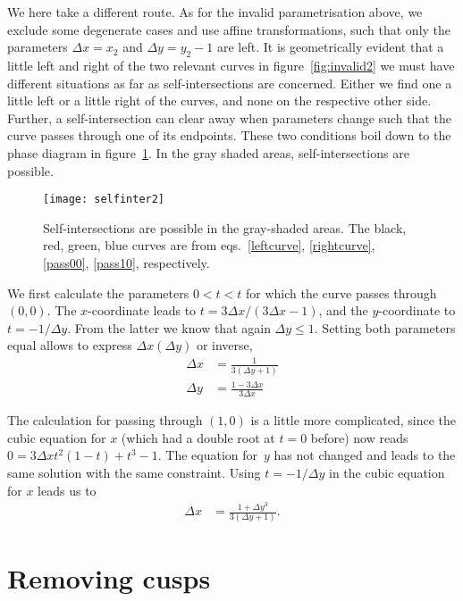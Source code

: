 \documentclass{article}
\begin{document}
We here take a different route. As for the invalid parametrisation above, we
exclude some degenerate cases and use affine transformations, such that only the
parameters $\Delta x=x_2$ and $\Delta y=y_2-1$ are left. It is geometrically
evident that a little left and right of the two relevant curves in
figure~\ref{fig:invalid2} we must have different situations as far as
self-intersections are concerned. Either we find one a little left or a little
right of the curves, and none on the respective other side. Further, a
self-intersection can clear away when parameters change such that the curve
passes through one of its endpoints. These two conditions boil down to the phase
diagram in figure~\ref{fig:selfinter2}. In the gray shaded areas,
self-intersections are possible.
%
\begin{figure}[t]
  \texttt{[image: selfinter2]}%
  \caption{Self-intersections are possible in the gray-shaded areas. The black,
  red, green, blue curves are from eqs.~\eqref{leftcurve}, \eqref{rightcurve},
  \eqref{pass00}, \eqref{pass10}, respectively.}%
  \label{fig:selfinter2}%
\end{figure}
%

We first calculate the parameters $0<t<t$ for which the curve passes through
$(0,0)$. The $x$-coordinate leads to $t=3\Delta x/(3\Delta x - 1)$, and the
$y$-coordinate to $t=-1/\Delta y$. From the latter we know that again $\Delta
y\leq 1$. Setting both parameters equal allows to express $\Delta x(\Delta y)$
or inverse,
%
\begin{align}
  \label{pass00}
  \Delta x &= \frac{1}{3(\Delta y+1)} \\
  \Delta y &= \frac{1-3\Delta x}{3\Delta x}
\end{align}
%

The calculation for passing through $(1,0)$ is a little more complicated, since
the cubic equation for $x$ (which had a double root at $t=0$ before) now reads
$0 = 3\Delta xt^2(1-t) + t^3 - 1$. The equation for~$y$ has not changed and
leads to the same solution with the same constraint. Using $t=-1/\Delta y$ in
the cubic equation for $x$ leads us to
%
\begin{align}
  \label{pass10}
  \Delta x &= \frac{1+\Delta y^3}{3(\Delta y+1)}.
\end{align}
%

\section{Removing cusps}
\end{document}
